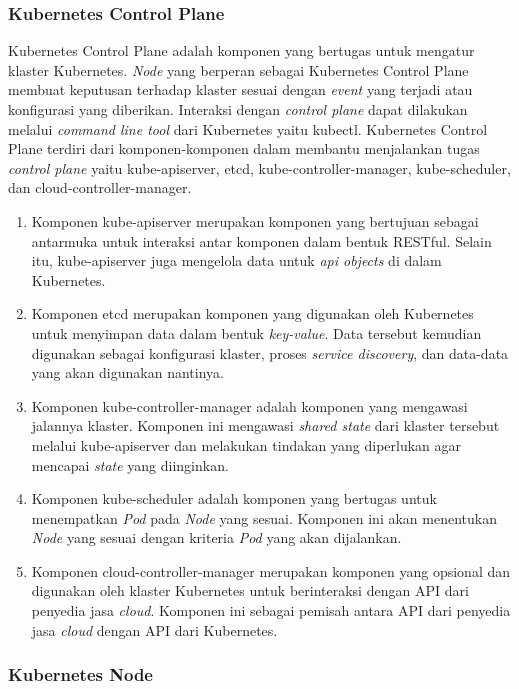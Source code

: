 \subsubsection{Kubernetes Control Plane}

Kubernetes Control Plane adalah komponen yang bertugas untuk mengatur
klaster Kubernetes. \emph{Node} yang berperan sebagai Kubernetes Control Plane
membuat keputusan terhadap klaster sesuai dengan \emph{event} yang terjadi atau
konfigurasi yang diberikan. Interaksi dengan \emph{control plane} dapat dilakukan
melalui \emph{command line tool} dari Kubernetes yaitu kubectl.
Kubernetes Control Plane terdiri dari komponen-komponen
dalam membantu menjalankan tugas \emph{control plane} yaitu kube-apiserver,
etcd, kube-controller-manager, kube-scheduler, dan cloud-controller-manager.

\begin{enumerate}[itemsep=-0.2cm, topsep=-0.3cm]
  \item{Komponen kube-apiserver merupakan komponen yang
    bertujuan sebagai antarmuka untuk interaksi antar komponen dalam bentuk
    RESTful. Selain itu, kube-apiserver juga mengelola data untuk \emph{api objects}
    di dalam Kubernetes.
  }
  \item{Komponen etcd merupakan komponen yang digunakan
    oleh Kubernetes untuk menyimpan data dalam bentuk \emph{key-value}.
    Data tersebut kemudian digunakan sebagai konfigurasi klaster, proses
    \emph{service discovery}, dan data-data yang akan digunakan nantinya.
  }
  \item{Komponen kube-controller-manager adalah komponen yang
    mengawasi jalannya klaster. Komponen ini mengawasi \emph{shared state} dari
    klaster tersebut melalui kube-apiserver dan melakukan tindakan yang diperlukan
    agar mencapai \emph{state} yang diinginkan.
  }
  \item{Komponen kube-scheduler adalah komponen yang bertugas
    untuk menempatkan \emph{Pod} pada \emph{Node} yang sesuai. Komponen ini
    akan menentukan \emph{Node} yang sesuai dengan kriteria \emph{Pod} yang
    akan dijalankan.
  }
  \item{Komponen cloud-controller-manager merupakan komponen
    yang opsional dan digunakan oleh klaster Kubernetes untuk berinteraksi
    dengan API dari penyedia jasa \emph{cloud}. Komponen ini sebagai pemisah
    antara API dari penyedia jasa \emph{cloud} dengan API dari Kubernetes.
  }
\end{enumerate}

\subsubsection{Kubernetes Node}

